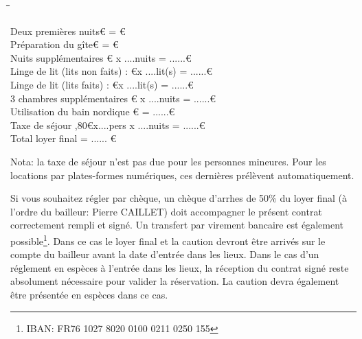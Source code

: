\documentclass[a4paper,11pt]{article}
\begin{document}
\begin{tabbing}
  
\hspace{6cm}\=  										\hspace{1cm}\=   	\hspace{4cm}\= 	\hspace{2cm}\= 		\hspace{2cm}\=	\kill


Deux premières nuits\euro		\>		\>=			\>220\>\euro\\
Préparation du gîte\euro		\>		\>=			\>80\>\euro\\
Nuits supplémentaires \euro\> x ....nuits		\>=			\>......\>\euro\\
Linge de lit (lits non faits) :	\euro\>x ....lit(s) \>=  	\>......\>\euro	\\
Linge de lit (lits faits) :	\euro\>x ....lit(s) \>=  	\>......\>\euro	\\
3 chambres supplémentaires \euro\> x ....nuits		\>=			\>......\>\euro\\
Utilisation du bain nordique \euro		\>		\>=			\>......\>\euro\\
Taxe de séjour ,80\euro		\>x....pers x ....nuits		\>=	\>......\>\euro\\

Total loyer final    										\>						\>  					\>=  							\>......					\>\euro			\\ 

 \end{tabbing}

Nota: la taxe de séjour n'est pas due pour les personnes mineures. Pour les locations par plates-formes numériques, ces dernières prélèvent automatiquement.


\vspace{0.5cm}

  
Si vous souhaitez régler par chèque, un chèque d'arrhes de 50\% du loyer final (à l'ordre du bailleur: Pierre CAILLET)  doit accompagner le présent contrat correctement rempli et signé. 
Un transfert par virement bancaire est également possible\footnote{IBAN: FR76 1027 8020 0100 0211 0250 155}. Dans ce cas le loyer final et la caution devront être arrivés sur le compte du bailleur avant la date d'entrée dans les lieux.
Dans le cas d'un réglement en espèces à l'entrée dans les lieux, la réception du contrat signé reste absolument nécessaire pour valider la réservation. La caution devra également être présentée en espèces dans ce cas.
\end{document}
